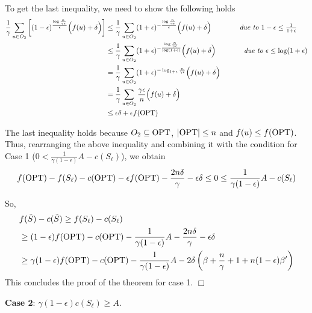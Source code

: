 \documentclass[10pt]{article} %
\theoremstyle{remark}
\newcommand{\OPT}{{\rm OPT}}
\begin{document}
    To get the last inequality, we need to show the following holds
    \begin{align*}
        \frac{1}{\gamma} \sum_{u \in O_2}\left[ (1-\epsilon)^{\frac{\log \frac{n}{\gamma \epsilon}}{\epsilon}}\Big(f(u) + \delta \Big) \right] &\leq   \frac{1}{\gamma} \sum_{u \in O_2} (1+\epsilon)^{-\frac{\log \frac{n}{\gamma \epsilon}}{\epsilon}}\Big(f(u) + \delta \Big) \quad \quad\quad \quad \mbox{\it due to $1-\epsilon \leq \frac{1}{1+\epsilon}$}\\
        &\leq  \frac{1}{\gamma} \sum_{u \in O_2} (1+\epsilon)^{-\frac{\log \frac{n}{\gamma \epsilon}}{\log (1+\epsilon)}}\Big(f(u) + \delta \Big) \quad \quad\quad \quad \mbox{\it due to $\epsilon \leq \log (1+\epsilon)$}\\
        &=    \frac{1}{\gamma} \sum_{u \in O_2} (1+\epsilon)^{-\log_{1+\epsilon} \frac{n}{\gamma \epsilon}}\Big(f(u) + \delta \Big) \\
        &=   \frac{1}{\gamma} \sum_{u \in O_2} \frac{\gamma \epsilon}{n} \Big(f(u) + \delta \Big)\\
        &\leq  \epsilon \delta+ \epsilon f(\OPT) 
    \end{align*}
    
    The last inequality holds because $O_2 \subseteq \OPT$, $|\OPT| \leq n$ and $f(u) \leq f(\OPT)$.
     Thus, rearranging the above inequality and combining it with the condition for Case 1 ($0< \frac{1}{\gamma (1-\epsilon)}A-c(S_\ell)$), we obtain
     \[ 
     f(\OPT)-f(S_\ell)-c(\OPT) - \epsilon f(\OPT) - \frac{2n\delta}{\gamma}  - \epsilon \delta \leq 0 \leq \frac{1}{\gamma (1-\epsilon)}A-c(S_\ell) 
     \]
     
     So, 
     \begin{align*}
         &f(\Tilde{S})-c(\Tilde{S}) \geq f(S_\ell)-c(S_\ell)\\
         &\geq (1-\epsilon)f(\OPT)-c(\OPT)-\frac{1}{\gamma (1-\epsilon)}A - \frac{2n\delta}{\gamma} - \epsilon \delta\\
         &\geq \gamma(1-\epsilon)f(\OPT)-c(\OPT)-\frac{1}{\gamma (1-\epsilon)}A - 2\delta\left(\beta+ \frac{n}{\gamma} + 1 + n(1-\epsilon)\beta'\right)
     \end{align*}
    {This concludes the proof of the theorem for case 1}. \hfill $\Box$


\textbf{Case 2}: $\gamma (1-\epsilon)c(S_\ell) \geq A$. 
\end{document}

